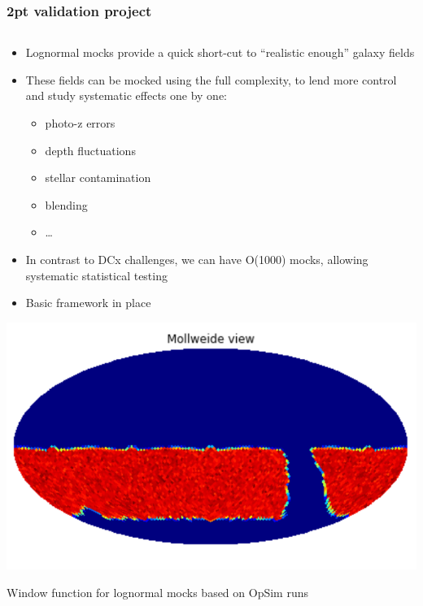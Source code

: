 \documentclass[aspectratio=169]{beamer}
\begin{document}
\begin{frame}
  \frametitle{2pt validation project}
  
  \begin{columns}
    \begin{column}{8cm}
      \begin{itemize}
        \scriptsize
      \item Lognormal mocks provide a quick short-cut to ``realistic
        enough'' galaxy fields
      \item These fields can be mocked using the full complexity, to
        lend more control and study systematic effects one by one:
        \begin{itemize}
\scriptsize
        \item photo-z errors
        \item depth fluctuations
        \item stellar contamination
        \item blending
        \item \ldots
        \end{itemize}
      \item In contrast to DCx challenges, we can have O(1000) mocks,
        allowing systematic statistical testing
      \item Basic framework in place
      \end{itemize}




      \vspace*{-0.7cm}
      \hfill \includegraphics[width=0.50\linewidth]{./random2pt.png}

       \hfill \tiny Window function for lognormal mocks based on OpSim runs



\end{column}
\end{columns}
\end{frame}
\end{document}
